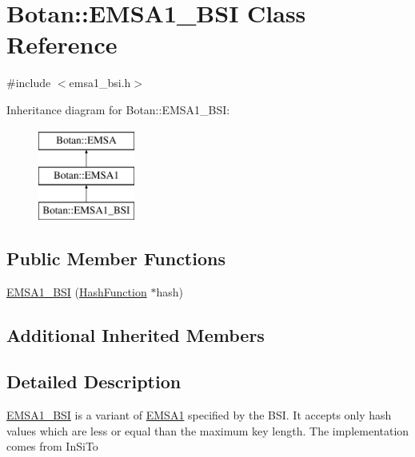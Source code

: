 \hypertarget{classBotan_1_1EMSA1__BSI}{\section{Botan\-:\-:E\-M\-S\-A1\-\_\-\-B\-S\-I Class Reference}
\label{classBotan_1_1EMSA1__BSI}
}


{\ttfamily \#include $<$emsa1\-\_\-bsi.\-h$>$}

Inheritance diagram for Botan\-:\-:E\-M\-S\-A1\-\_\-\-B\-S\-I\-:\begin{figure}[H]
\begin{center}
\leavevmode
\includegraphics[height=3.000000cm]{classBotan_1_1EMSA1__BSI}
\end{center}
\end{figure}
\subsection*{Public Member Functions}
\begin{DoxyCompactItemize}
\item 
\hyperlink{classBotan_1_1EMSA1__BSI_a133a08994330cda68b7c8d61abbf2b56}{E\-M\-S\-A1\-\_\-\-B\-S\-I} (\hyperlink{classBotan_1_1HashFunction}{Hash\-Function} $\ast$hash)
\end{DoxyCompactItemize}
\subsection*{Additional Inherited Members}


\subsection{Detailed Description}
\hyperlink{classBotan_1_1EMSA1__BSI}{E\-M\-S\-A1\-\_\-\-B\-S\-I} is a variant of \hyperlink{classBotan_1_1EMSA1}{E\-M\-S\-A1} specified by the B\-S\-I. It accepts only hash values which are less or equal than the maximum key length. The implementation comes from In\-Si\-To 

